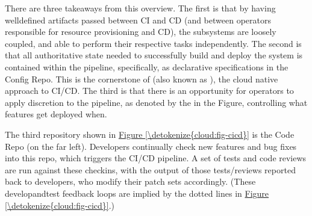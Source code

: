 \documentclass[a4paper,11pt,english]{sphinxmanual}
\begin{document}
\begin{sphinxShadowBox}

\sphinxAtStartPar
{}

\sphinxAtStartPar
{}
\end{sphinxShadowBox}

\sphinxAtStartPar
There are three takeaways from this overview. The first is that by
having well\sphinxhyphen{}defined artifacts passed between CI and CD (and between
operators responsible for resource provisioning and CD), the
subsystems are loosely coupled, and able to perform their respective
tasks independently. The second is that all authoritative state needed
to successfully build and deploy the system is contained within the
pipeline, specifically, as declarative specifications in the Config
Repo. This is the cornerstone of  (also known
as ), the cloud native approach to CI/CD. The third is that
there is an opportunity for operators to apply discretion to the
pipeline, as denoted by the  in the Figure,
controlling what features get deployed when.

\sphinxAtStartPar
The third repository shown in \hyperref[\detokenize{cloud:fig-cicd}]{Figure \ref{\detokenize{cloud:fig-cicd}}} is the
Code Repo (on the far left). Developers continually check new features
and bug fixes into this repo, which triggers the CI/CD pipeline. A set
of tests and code reviews are run against these check\sphinxhyphen{}ins, with the
output of those tests/reviews reported back to developers, who modify
their patch sets accordingly. (These develop\sphinxhyphen{}and\sphinxhyphen{}test feedback loops
are implied by the dotted lines in \hyperref[\detokenize{cloud:fig-cicd}]{Figure \ref{\detokenize{cloud:fig-cicd}}}.)
\end{document}
